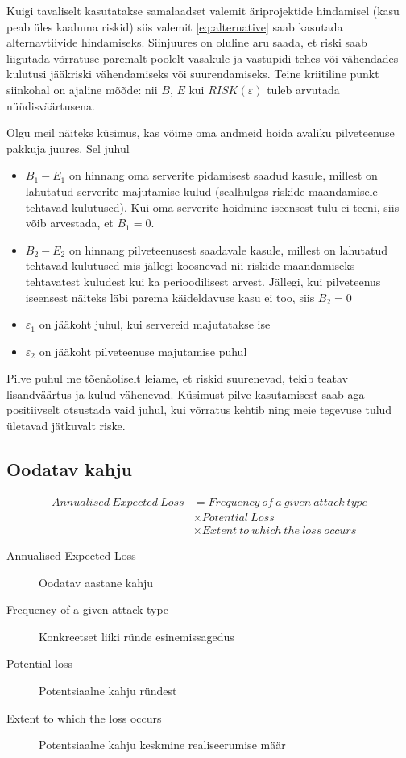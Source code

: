 \documentclass{tufte-book}
\begin{document}
Kuigi tavaliselt kasutatakse samalaadset valemit äriprojektide hindamisel (kasu peab üles kaaluma riskid) siis valemit \ref{eq:alternative} saab kasutada alternavtiivide hindamiseks. Siinjuures on oluline aru saada, et riski saab liigutada võrratuse paremalt poolelt vasakule ja vastupidi tehes või vähendades kulutusi jääkriski vähendamiseks või suurendamiseks. Teine kriitiline punkt siinkohal on ajaline mõõde: nii $B$, $E$ kui $RISK(\varepsilon)$ tuleb arvutada nüüdisväärtusena.

Olgu meil näiteks küsimus, kas võime oma andmeid hoida avaliku pilveteenuse pakkuja juures. Sel juhul 
\begin{itemize}
	\item $B_1-E_1$ on hinnang oma serverite pidamisest saadud kasule, millest on lahutatud serverite majutamise kulud (sealhulgas riskide maandamisele tehtavad kulutused). Kui oma serverite hoidmine iseensest tulu ei teeni, siis võib arvestada, et $B_1=0$. 
	\item $B_2-E_2$ on hinnang pilveteenusest saadavale kasule, millest on lahutatud tehtavad kulutused mis jällegi koosnevad nii riskide maandamiseks tehtavatest kuludest kui ka perioodilisest arvest. Jällegi, kui pilveteenus iseensest näiteks läbi parema käideldavuse kasu ei too, siis $B_2=0$
	\item $\varepsilon_1$ on jääkoht juhul, kui servereid majutatakse ise
	\item $\varepsilon_2$ on jääkoht pilveteenuse majutamise puhul
\end{itemize}

Pilve puhul me tõenäoliselt leiame, et riskid suurenevad, tekib teatav lisandväärtus ja kulud vähenevad. Küsimust pilve kasutamisest saab aga positiivselt otsustada vaid juhul, kui võrratus kehtib ning meie tegevuse tulud ületavad jätkuvalt riske.


\subsection{Oodatav kahju} 

	\begin{align}
		Annualised\ Expected\ Loss &= Frequency\ of\ a\ given\ attack\ type \label{eq:loss}\\
		&\times Potential\ Loss \nonumber \\
		&\times Extent\ to\ which\ the\ loss\ occurs \nonumber
	\end{align}


\begin{description}
	\item[Annualised Expected Loss] Oodatav aastane kahju
	\item[Frequency of a given attack type] Konkreetset liiki ründe esinemissagedus
	\item[Potential loss] Potentsiaalne kahju ründest
	\item[Extent to which the loss occurs] Potentsiaalne kahju keskmine realiseerumise määr
\end{description}
\end{document}
